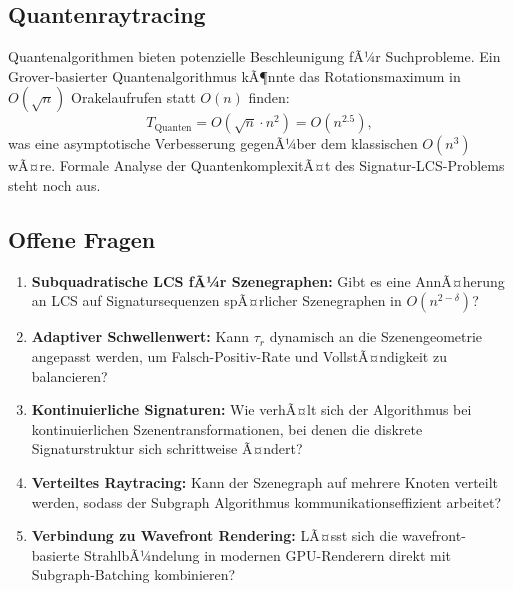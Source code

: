 ﻿\documentclass[a4paper,12pt]{article}
\theoremstyle{definition}
\begin{document}
\subsection{Quantenraytracing}

Quantenalgorithmen bieten potenzielle Beschleunigung fÃ¼r
Suchprobleme. Ein Grover-basierter Quantenalgorithmus
\citep{Grover1996} kÃ¶nnte das Rotationsmaximum in
$O(\sqrt{n})$ Orakelaufrufen statt $O(n)$ finden:
\[
  T_{\mathrm{Quanten}} = O(\sqrt{n} \cdot n^2) = O(n^{2.5}),
\]
was eine asymptotische Verbesserung gegenÃ¼ber dem klassischen
$O(n^3)$ wÃ¤re. Formale Analyse der QuantenkomplexitÃ¤t des
Signatur-LCS-Problems steht noch aus.

\subsection{Offene Fragen}

\begin{enumerate}
  \item \textbf{Subquadratische LCS fÃ¼r Szenegraphen:} Gibt es
        eine AnnÃ¤herung an LCS auf Signatursequenzen spÃ¤rlicher
        Szenegraphen in $O(n^{2-\delta})$?
  \item \textbf{Adaptiver Schwellenwert:} Kann $\tau_r$ dynamisch
        an die Szenengeometrie angepasst werden, um
        Falsch-Positiv-Rate und VollstÃ¤ndigkeit zu balancieren?
  \item \textbf{Kontinuierliche Signaturen:} Wie verhÃ¤lt sich der
        Algorithmus bei kontinuierlichen Szenentransformationen,
        bei denen die diskrete Signaturstruktur sich schrittweise
        Ã¤ndert?
  \item \textbf{Verteiltes Raytracing:} Kann der Szenegraph auf
        mehrere Knoten verteilt werden, sodass der Subgraph
        Algorithmus kommunikationseffizient arbeitet?
  \item \textbf{Verbindung zu Wavefront Rendering:} LÃ¤sst sich
        die wavefront-basierte StrahlbÃ¼ndelung in modernen
        GPU-Renderern direkt mit Subgraph-Batching kombinieren?
\end{enumerate}
\end{document}
